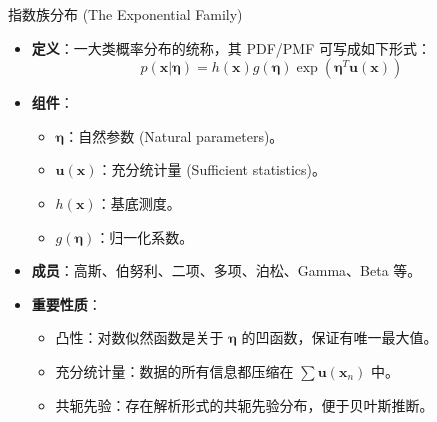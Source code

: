 \documentclass[12pt, aspectratio=169]{beamer}
\newcommand{\vect}[1]{\mathbf{#1}}
\begin{document}
\begin{frame}{指数族分布 (The Exponential Family)}
    \begin{itemize}
        \item \textbf{定义}：一大类概率分布的统称，其 PDF/PMF 可写成如下形式：
        $$ p(\vect{x}|\boldsymbol{\eta}) = h(\vect{x}) g(\boldsymbol{\eta}) \exp\left( \boldsymbol{\eta}^T \vect{u}(\vect{x}) \right) $$
        \item \textbf{组件}：
        \begin{itemize}
            \item $\boldsymbol{\eta}$：自然参数 (Natural parameters)。
            \item $\vect{u}(\vect{x})$：充分统计量 (Sufficient statistics)。
            \item $h(\vect{x})$：基底测度。
            \item $g(\boldsymbol{\eta})$：归一化系数。
        \end{itemize}
        \item \textbf{成员}：高斯、伯努利、二项、多项、泊松、Gamma、Beta 等。
        \item \textbf{重要性质}：
        \begin{itemize}
            \item 凸性：对数似然函数是关于 $\boldsymbol{\eta}$ 的凹函数，保证有唯一最大值。
            \item 充分统计量：数据的所有信息都压缩在 $\sum \vect{u}(\vect{x}_n)$ 中。
            \item 共轭先验：存在解析形式的共轭先验分布，便于贝叶斯推断。
        \end{itemize}
    \end{itemize}
\end{frame}
\end{document}
